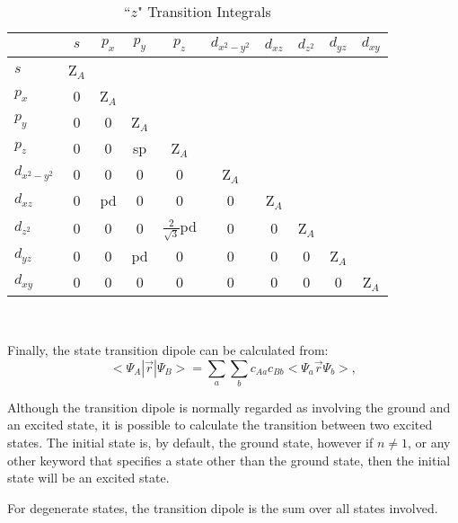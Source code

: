 \begin{table}
\caption{\label{transz} ``$z$" Transition Integrals}
\begin{center}

\begin{tabular}{l|ccccccccc} \hline
& $s$  &  $p_x$  &  $p_y$  &  $p_z$  &  $d_{x^2-y^2}$  & $d_{xz}$  &
$d_{z^2}$  &  $d_{yz}$  &  $d_{xy}$ \\ \hline
$s$ & Z$_A$\\
$p_x$ & 0 & Z$_A$\\
$p_y$  & 0 & 0 & Z$_A$ \\
$p_z$  & 0 & 0 & sp & Z$_A$\\
$d_{x^2-y^2}$ & 0 & 0 & 0 & 0 & Z$_A$\\
$d_{xz}$      & 0 & pd & 0 & 0 & 0 & Z$_A$\\
$d_{z^2}$     & 0 & 0 & 0 & $\frac{2}{\sqrt{3}}$pd & 0 & 0 & Z$_A$\\
$d_{yz}$      & 0 & 0 & pd & 0 & 0 & 0 & 0 & Z$_A$\\
$d_{xy}$      & 0 & 0 & 0 & 0 & 0 & 0 & 0 & 0 & Z$_A$\\  \hline
\end{tabular}\\
\end{center}
\end{table}


Finally, the state transition dipole can be calculated from:
$$
<\! \Psi_A|\vec{r}|\Psi_B\! > =\sum_a\sum_bc_{A a}c_{B b}<\! \Psi_a\vec{r}\Psi_b \!>,
$$

Although the transition dipole is normally regarded as involving the ground and an excited state, it is
possible to calculate the transition between two excited states.  The initial state is, by default, the
ground state, however if  $n\neq 1$, or any other keyword that specifies
a state other than the ground state, then the initial state will be an excited state.

For degenerate states, the transition dipole is the sum over all states involved.
